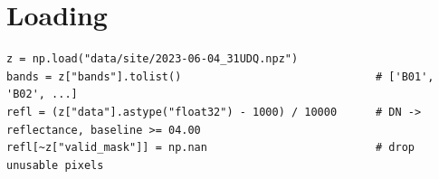 \documentclass[10pt,a4paper]{article}
\begin{document}
\section{Loading}

{\small
\begin{verbatim}
z = np.load("data/site/2023-06-04_31UDQ.npz")
bands = z["bands"].tolist()                              # ['B01', 'B02', ...]
refl = (z["data"].astype("float32") - 1000) / 10000      # DN -> reflectance, baseline >= 04.00
refl[~z["valid_mask"]] = np.nan                          # drop unusable pixels
\end{verbatim}}
\end{document}
